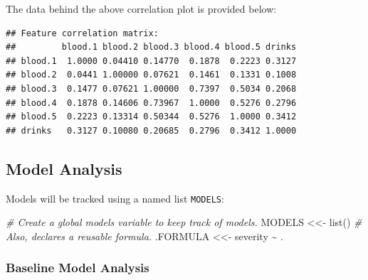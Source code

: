 \documentclass[
  11pt,
  a4paper,
]{scrartcl}
\newenvironment{Shaded}{\begin{snugshade}}{\end{snugshade}}
\newcommand{\AttributeTok}[1]{\textcolor[rgb]{0.77,0.63,0.00}{#1}}
\newcommand{\CommentTok}[1]{\textcolor[rgb]{0.56,0.35,0.01}{\textit{#1}}}
\newcommand{\FunctionTok}[1]{\textcolor[rgb]{0.00,0.00,0.00}{#1}}
\newcommand{\NormalTok}[1]{#1}
\newcommand{\OtherTok}[1]{\textcolor[rgb]{0.56,0.35,0.01}{#1}}
\newcommand{\SpecialCharTok}[1]{\textcolor[rgb]{0.00,0.00,0.00}{#1}}
\begin{document}
The data behind the above correlation plot is provided below:

\begin{verbatim}
## Feature correlation matrix: 
##         blood.1 blood.2 blood.3 blood.4 blood.5 drinks
## blood.1  1.0000 0.04410 0.14770  0.1878  0.2223 0.3127
## blood.2  0.0441 1.00000 0.07621  0.1461  0.1331 0.1008
## blood.3  0.1477 0.07621 1.00000  0.7397  0.5034 0.2068
## blood.4  0.1878 0.14606 0.73967  1.0000  0.5276 0.2796
## blood.5  0.2223 0.13314 0.50344  0.5276  1.0000 0.3412
## drinks   0.3127 0.10080 0.20685  0.2796  0.3412 1.0000
\end{verbatim}

\hypertarget{model-analysis}{%
\subsection{Model Analysis}\label{model-analysis}}

Models will be tracked using a named list \texttt{MODELS}:

\begin{Shaded}
\begin{Highlighting}[]
\CommentTok{\# Create a global \textasciigrave{}models\textasciigrave{} variable to keep track of models.}
\NormalTok{MODELS }\OtherTok{\textless{}\textless{}{-}} \FunctionTok{list}\NormalTok{()}
\CommentTok{\# Also, declares a reusable formula.}
\NormalTok{.FORMULA }\OtherTok{\textless{}\textless{}{-}}\NormalTok{ severity }\SpecialCharTok{\textasciitilde{}}\NormalTok{ .}
\end{Highlighting}
\end{Shaded}

\hypertarget{baseline-model-analysis}{%
\subsubsection{Baseline Model Analysis}\label{baseline-model-analysis}}

\begin{Shaded}
\end{Shaded}
\end{document}
